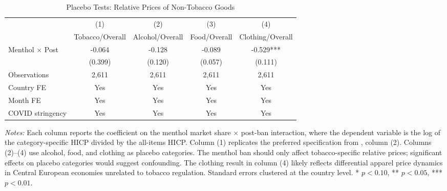 \begin{table}[H]
\centering
\caption{Placebo Tests: Relative Prices of Non-Tobacco Goods}
\label{tab:placebo}
\begin{threeparttable}
\begin{tabular}{lcccc}
\toprule
 & (1) & (2) & (3) & (4) \\
 & Tobacco/Overall & Alcohol/Overall & Food/Overall & Clothing/Overall \\
\midrule
Menthol $\times$ Post & -0.064 & -0.128 & -0.089 & -0.529*** \\
 & (0.399) & (0.120) & (0.057) & (0.111) \\
[4pt]
Observations & 2,611 & 2,611 & 2,611 & 2,611 \\
Country FE & Yes & Yes & Yes & Yes \\
Month FE & Yes & Yes & Yes & Yes \\
COVID stringency & Yes & Yes & Yes & Yes \\
\bottomrule
\end{tabular}
\begin{tablenotes}[flushleft]
\footnotesize \sloppy
\item \textit{Notes:} Each column reports the coefficient on the menthol market share $\times$ post-ban interaction, where the dependent variable is the log of the category-specific HICP divided by the all-items HICP. Column (1) replicates the preferred specification from , column (2). Columns (2)--(4) use alcohol, food, and clothing as placebo categories. The menthol ban should only affect tobacco-specific relative prices; significant effects on placebo categories would suggest confounding. The clothing result in column (4) likely reflects differential apparel price dynamics in Central European economies unrelated to tobacco regulation. Standard errors clustered at the country level. * $p<0.10$, ** $p<0.05$, *** $p<0.01$.
\end{tablenotes}
\end{threeparttable}
\end{table}
